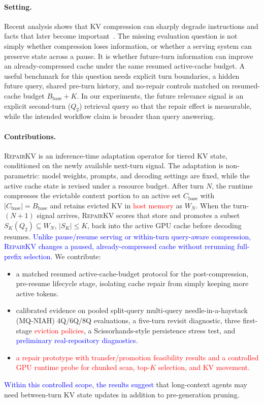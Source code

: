 \documentclass{article}
\newcommand{\repairkv}{\textsc{RepairKV}}
\newcommand{\bbase}{\ensuremath{B_{\mathrm{base}}}}
\begin{document}
\paragraph{Setting.}
Recent analysis shows that KV compression can sharply degrade
instructions and facts that later become important~\citep{pitfalls}.
The missing evaluation question is not simply whether compression loses
information, or whether a serving system can preserve state across a pause.
It is whether future-turn information can improve an already-compressed
cache under the same resumed active-cache budget.
A useful benchmark for this question needs explicit turn boundaries, a
hidden future query, shared pre-turn history, and no-repair controls matched
on resumed-cache budget $\bbase+K$.
In our experiments, the future relevance signal is an explicit second-turn
($Q_2$) retrieval query so that the repair effect is measurable, while the
intended workflow claim is broader than query answering.

\paragraph{Contributions.}
\repairkv{} is an inference-time adaptation operator for tiered KV state,
conditioned on the newly available next-turn signal.
The adaptation is non-parametric: model weights, prompts, and decoding
settings are fixed, while the active cache state is revised under a
resource budget.
After turn $N$, the runtime compresses the evictable context portion to
an active set $C_{\mathrm{base}}$ with $|C_{\mathrm{base}}|=\bbase$ and
retains evicted KV in \textcolor{red}{host memory} as $W_N$.
When the turn-$(N{+}1)$ signal arrives, \repairkv{} scores that store and
promotes a subset $S_K(Q_2)\subseteq W_N$, $|S_K|\le K$, back into the
active GPU cache before decoding resumes.
\textcolor{blue}{Unlike pause/resume serving or within-turn query-aware compression, \repairkv{}
changes a paused, already-compressed cache without rerunning full-prefix
selection.}
We contribute:
\begin{itemize}[leftmargin=1.4em,noitemsep,topsep=2pt]
  \item a matched resumed active-cache-budget protocol for the
  post-compression, pre-resume lifecycle stage, isolating cache repair
  from simply keeping more active tokens.
  \item calibrated evidence on pooled split-query multi-query
  needle-in-a-haystack (MQ-NIAH) 4Q/6Q/8Q evaluations, a five-turn
  revisit diagnostic, three first-stage \textcolor{red}{eviction policies}, a
  Scissorhands-style persistence stress test, and \textcolor{blue}{preliminary
  real-repository diagnostics}.
  \item \textcolor{red}{a repair prototype with transfer/promotion feasibility
  results and a controlled GPU runtime probe for chunked scan, top-$K$
  selection, and KV movement.}
\end{itemize}
\textcolor{blue}{Within this controlled scope, the results suggest} that long-context agents may need
between-turn KV state updates in addition to pre-generation pruning. 
\end{document}
